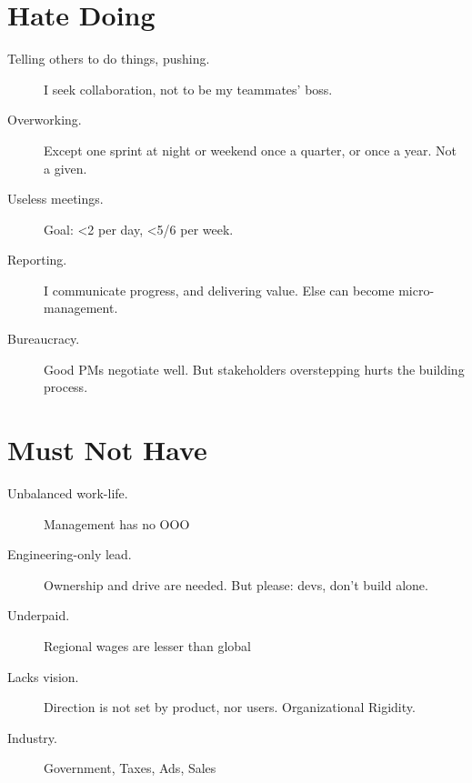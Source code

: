 \documentclass[10pt, a4paper, twocolumn]{article}
\begin{document}
\vfill\eject

\section*{Hate Doing}

\begin{description}
 \item[Telling others to do things, pushing.]
 I seek %
 collaboration, %
 not to be my teammates' boss.
 \item[Overworking.] Except one sprint at night or weekend once a quarter, or once a year.
 Not a given.
 \item[Useless meetings.] Goal: <2 per day,  <5/6 per week. %
 \item[Reporting.]
 I communicate progress, %
 and delivering value. %
 Else can become micro-management.
  \item[Bureaucracy.] Good PMs negotiate well.
  But stakeholders overstepping hurts the building process.
\end{description}



\section*{Must Not Have}

\begin{description}
  \item[Unbalanced work-life.] Management has no OOO
  \item[Engineering-only lead.]
  Ownership and drive are needed.
  But please: %
  devs, don't build alone.
 \item[Underpaid.] Regional wages are lesser than global
 \item[Lacks vision.] Direction is not set by product, nor users. Organizational Rigidity.
  \item[Industry.] Government, Taxes, Ads, Sales %
\end{description}
\end{document}
